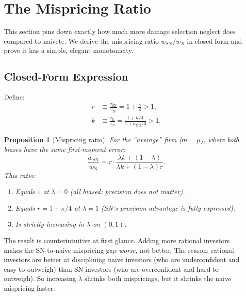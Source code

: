 \documentclass[12pt]{article}
\theoremstyle{plain}
\newtheorem{proposition}{Proposition}
\theoremstyle{definition}
\newcommand{\ND}{\mathrm{ND}}
\newcommand{\R}{\mathrm{R}}
\newcommand{\SN}{\mathrm{SN}}
\newcommand{\N}{\mathrm{N}}
\begin{document}
\section{The Mispricing Ratio}
\label{sec:mispricing_ratio}

This section pins down exactly how much more damage selection neglect does compared to naivete. We derive the mispricing ratio $w_\SN/w_\N$ in closed form and prove it has a simple, elegant monotonicity.

\subsection{Closed-Form Expression}

Define:
\begin{align}
r &\equiv \frac{\tau_\SN}{\tau_\N} = 1 + \frac{\kappa}{4} > 1, \label{eq:r_def} \\
k &\equiv \frac{\tau_\R}{\tau_\N} = \frac{1 + \kappa/4}{1 + \kappa_{\ND}/4} > 1. \label{eq:k_def}
\end{align}

\begin{proposition}[Mispricing ratio]
\label{prop:mispricing_ratio}
For the ``average'' firm ($m = \mu$), where both biases have the same first-moment error:
\begin{equation}
\boxed{\frac{w_\SN}{w_\N} = r \cdot \frac{\lambda k + (1 - \lambda)}{\lambda k + (1 - \lambda)r}.}
\label{eq:ratio_formula}
\end{equation}
This ratio:
\begin{enumerate}[nosep]
\item Equals $1$ at $\lambda = 0$ (all biased: precision does not matter).
\item Equals $r = 1 + \kappa/4$ at $\lambda = 1$ (SN's precision advantage is fully expressed).
\item Is strictly increasing in $\lambda$ on $(0, 1)$.
\end{enumerate}
\end{proposition}

The result is counterintuitive at first glance. Adding more rational investors makes the SN-to-naive mispricing gap \emph{worse}, not better. The reason: rational investors are better at disciplining naive investors (who are underconfident and easy to outweigh) than SN investors (who are overconfident and hard to outweigh). So increasing $\lambda$ shrinks both mispricings, but it shrinks the naive mispricing faster.
\end{document}
